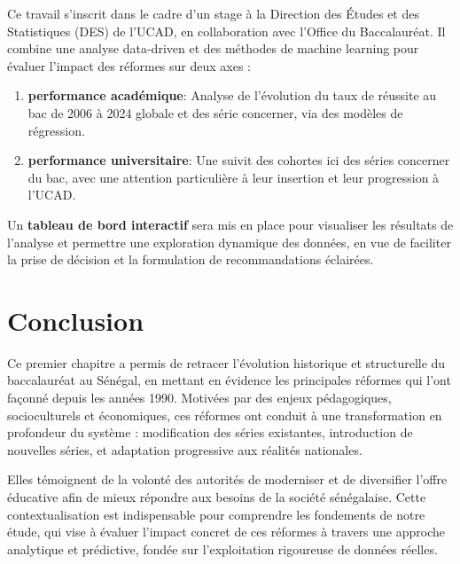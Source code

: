 Ce travail s’inscrit dans le cadre d’un stage à la Direction des Études et des Statistiques (DES) de l’UCAD, en collaboration avec l’Office du Baccalauréat. 
Il combine une analyse data-driven et des méthodes de machine learning pour évaluer l’impact des réformes sur deux axes :
\begin{enumerate}
    \item \textbf{performance académique}: Analyse de l'évolution du taux de réussite au bac de 2006 à 2024 globale et des série concerner, via des modèles de régression.
    \item \textbf{performance universitaire}: Une suivit des cohortes ici des séries concerner du bac, avec une attention particulière à leur insertion et leur progression à l’UCAD. 
\end{enumerate}
Un \textbf{tableau de bord interactif} sera mis en place pour visualiser les résultats de l'analyse et permettre une exploration dynamique des données, en vue de faciliter la prise de décision et la formulation de recommandations éclairées.

\section{Conclusion}

Ce premier chapitre a permis de retracer l’évolution historique et structurelle du baccalauréat au Sénégal, en mettant en évidence les principales réformes qui l’ont façonné depuis les années 1990. 
Motivées par des enjeux pédagogiques, socioculturels et économiques, ces réformes ont conduit à une transformation en profondeur du système : modification des séries existantes, introduction de nouvelles séries, et adaptation progressive aux réalités nationales.

Elles témoignent de la volonté des autorités de moderniser et de diversifier l’offre éducative afin de mieux répondre aux besoins de la société sénégalaise. 
Cette contextualisation est indispensable pour comprendre les fondements de notre étude, qui vise à évaluer l’impact concret de ces réformes à travers une approche analytique et prédictive, fondée sur l’exploitation rigoureuse de données réelles.
